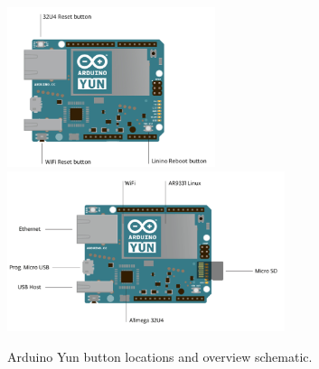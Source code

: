 \documentclass[11pt]{article}
\begin{document}
\begin{figure}[h]
\begin{center}
\includegraphics[width = 2.4in]{arduino1.png}
\includegraphics[width = 3.2in]{arduino2.png}
\caption{Arduino Yun button locations and overview schematic.}  
\label{YunFig}
\end{center}
\end{figure}
\end{document}
